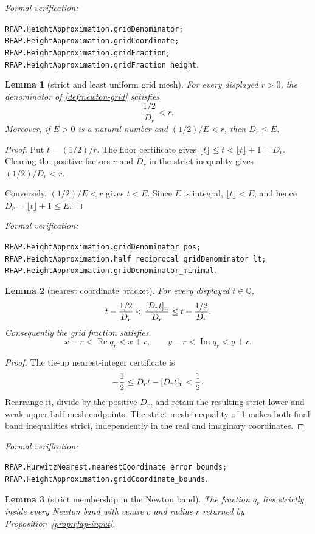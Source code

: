 \documentclass[11pt]{article}
\newtheorem{lemma}[lemma]{Lemma}
\newcommand{\Q}{\mathbb{Q}}
\newcommand{\Ree}{\operatorname{Re}}
\newcommand{\Imm}{\operatorname{Im}}
\newcommand{\leanref}[1]{\par\smallskip\noindent
  \emph{Formal verification:}\par\nobreak
  {\raggedright\nolinkurl{#1}.\par}}
\begin{document}
\leanref{RFAP.HeightApproximation.gridDenominator;
RFAP.HeightApproximation.gridCoordinate;
RFAP.HeightApproximation.gridFraction;
RFAP.HeightApproximation.gridFraction_height}

\begin{lemma}[strict and least uniform grid mesh]
\label{lem:grid-mesh}
For every displayed $r>0$, the denominator of
\cref{def:newton-grid} satisfies
\[
                         \frac{1/2}{D_r}<r.
\]
Moreover, if $E>0$ is a natural number and $(1/2)/E<r$, then $D_r\le E$.
\end{lemma}

\begin{proof}
Put $t=(1/2)/r$.  The floor certificate gives
$\lfloor t\rfloor\le t<\lfloor t\rfloor+1=D_r$.  Clearing the positive
factors $r$ and $D_r$ in the strict inequality gives $(1/2)/D_r<r$.

Conversely, $(1/2)/E<r$ gives $t<E$.  Since $E$ is integral,
$\lfloor t\rfloor<E$, and hence $D_r=\lfloor t\rfloor+1\le E$.
\end{proof}

\leanref{RFAP.HeightApproximation.gridDenominator_pos;
RFAP.HeightApproximation.half_reciprocal_gridDenominator_lt;
RFAP.HeightApproximation.gridDenominator_minimal}

\begin{lemma}[nearest coordinate bracket]
\label{lem:grid-coordinate}
For every displayed $t\in\Q$,
\[
 t-\frac{1/2}{D_r}
 <\frac{[D_rt]_{\rm n}}{D_r}
 \le t+\frac{1/2}{D_r}.
\]
Consequently the grid fraction satisfies
\[
 x-r<\Ree q_r<x+r,
 \qquad
 y-r<\Imm q_r<y+r.
\]
\end{lemma}

\begin{proof}
The tie-up nearest-integer certificate is
\[
               -\frac12\le D_rt-[D_rt]_{\rm n}<\frac12.
\]
Rearrange it, divide by the positive $D_r$, and retain the resulting strict
lower and weak upper half-mesh endpoints.  The strict mesh inequality of
\cref{lem:grid-mesh} makes both final band inequalities strict, independently
in the real and imaginary coordinates.
\end{proof}

\leanref{RFAP.HurwitzNearest.nearestCoordinate_error_bounds;
RFAP.HeightApproximation.gridCoordinate_bounds}

\begin{lemma}[strict membership in the Newton band]
\label{lem:grid}
The fraction $q_r$ lies strictly inside every Newton band with centre $c$ and
radius $r$ returned by Proposition~\ref{prop:rfap-input}.
\end{lemma}
\end{document}

